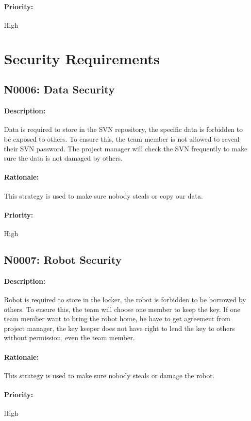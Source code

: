 \documentclass[11pt, a4paper]{report}
\begin{document}
\paragraph{Priority:}
High

\section{Security Requirements}
\subsection{N0006: Data Security}
\paragraph{Description:}
Data is required to store in the SVN repository, the specific data is forbidden to be exposed to others. To ensure this, the team member is not allowed to reveal their SVN password. The project manager will check the SVN frequently to make sure the data is not damaged by others.
\paragraph{Rationale:}
This strategy is used to make sure nobody steals or copy our data.
\paragraph{Priority:}
High
\subsection{N0007: Robot Security}
\paragraph{Description:}
Robot is required to store in the locker, the robot is forbidden to be borrowed by others. To ensure this, the team will choose one member to keep the key. If one team member want to bring the robot home, he have to get agreement from project manager, the key keeper does not have right to lend the key to others without permission, even the team member. 
\paragraph{Rationale:}
This strategy is used to make sure nobody steals or damage the robot.
\paragraph{Priority:}
High
\end{document}
